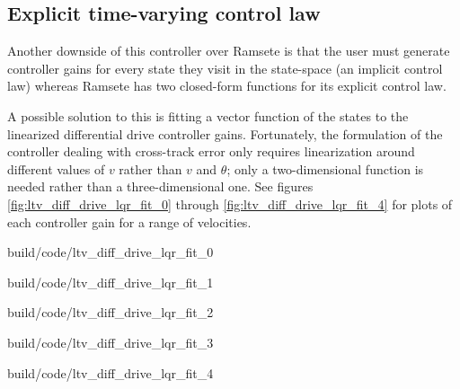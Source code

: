 \subsection{Explicit time-varying control law}

Another downside of this controller over Ramsete is that the user must generate
controller gains for every state they visit in the state-space (an implicit
control law) whereas Ramsete has two closed-form functions for its explicit
control law.

A possible solution to this is fitting a vector function of the states to the
linearized differential drive controller gains. Fortunately, the formulation of
the controller dealing with cross-track error only requires linearization around
different values of $v$ rather than $v$ and $\theta$; only a two-dimensional
function is needed rather than a three-dimensional one. See figures
\ref{fig:ltv_diff_drive_lqr_fit_0} through
\ref{fig:ltv_diff_drive_lqr_fit_4} for plots of each controller gain for
a range of velocities.

\begin{bookfigure}
  \begin{minisvg}{2}{build/code/ltv_diff_drive_lqr_fit_0}
    \caption{Linear time-varying differential drive controller LQR gain
      regression fit ($x$)}
    \label{fig:ltv_diff_drive_lqr_fit_0}
  \end{minisvg}
  \hfill
  \begin{minisvg}{2}{build/code/ltv_diff_drive_lqr_fit_1}
    \caption{Linear time-varying differential drive controller LQR gain fit
      regression fit ($y$)}
  \end{minisvg}
  \hfill
  \begin{minisvg}{2}{build/code/ltv_diff_drive_lqr_fit_2}
    \caption{Linear time-varying differential drive controller LQR gain
      regression fit ($\theta$)}
  \end{minisvg}
  \hfill
  \begin{minisvg}{2}{build/code/ltv_diff_drive_lqr_fit_3}
    \caption{Linear time-varying differential drive controller LQR gain
      regression fit ($v_l$)}
  \end{minisvg}
  \hfill
  \begin{minisvg}{2}{build/code/ltv_diff_drive_lqr_fit_4}
    \caption{Linear time-varying differential drive controller LQR gain
      regression fit ($v_r$)}
    \label{fig:ltv_diff_drive_lqr_fit_4}
  \end{minisvg}
\end{bookfigure}


